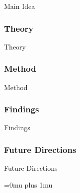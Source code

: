 \noindent
Main Idea

\subsubsection{Theory}

\noindent
Theory

\subsubsection{Method}

\noindent
Method

\subsubsection{Findings}

\noindent
Findings

\subsubsection{Future Directions}

\noindent
Future Directions 

\Urlmuskip=0mu plus 1mu\relax
\pagebreak
